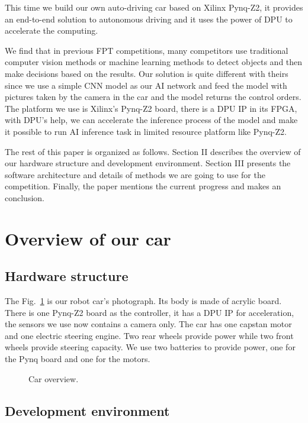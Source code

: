 \documentclass[conference]{IEEEtran}
\begin{document}
This time we build our own auto-driving car based on Xilinx Pynq-Z2\cite{b4}, it provides an end-to-end solution to autonomous driving and it uses the power of DPU\cite{b5} to accelerate the computing. 

We find that in previous FPT competitions\cite{b6}, many competitors use traditional computer vision methods or machine learning methods to detect objects and then make decisions based on the results\cite{b7}\cite{b8}. Our solution is quite different with theirs since we use a simple CNN model as our AI network and feed the model with pictures taken by the camera in the car and the model returns the control orders.
The platform we use is Xilinx’s Pynq-Z2 board, there is a DPU IP in its FPGA, with DPU’s help, we can accelerate the inference process of the model and make it possible to run AI inference task in limited resource platform like Pynq-Z2.

The rest of this paper is organized as follows. Section II describes the overview of our hardware structure and development environment. Section III presents the software architecture and details of methods we are going to use for the competition. Finally, the paper mentions the current progress and makes an conclusion.

\section{Overview of our car}

\subsection{Hardware structure}

The Fig.~\ref{co} is our robot car's photograph. Its body is made of acrylic board. There is one Pynq-Z2 board as the controller, it has a DPU IP for acceleration, the sensors we use now contains a camera only. The car has one capstan motor and one electric steering engine. Two rear wheels provide power while two front wheels provide steering capacity. We use two batteries to provide power, one for the Pynq board and one for the motors.

\begin{figure}[htbp]
\caption{Car overview.}
\label{co}
\end{figure}

\subsection{Development environment}
\end{document}
